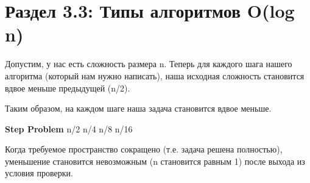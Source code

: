 \vspace{\baselineskip}
\section*{Раздел 3.3: Типы алгоритмов O(log n)}

\vspace{\baselineskip}
Допустим, у нас есть сложность размера n. Теперь для каждого шага нашего алгоритма (который нам нужно написать), наша исходная сложность становится вдвое меньше предыдущей  (n/2).

\vspace{\baselineskip}
Таким образом, на каждом шаге наша задача становится вдвое меньше.

\vspace{\baselineskip}

\textbf{Step Problem} \hspace{6,5mm} n/2  \hspace*{6,5mm} n/4  \hspace*{6,5mm} n/8  \hspace*{6,5mm} n/16 \newline


Когда  требуемое пространство сокращено (т.е. задача решена полностью), уменьшение становится невозможным (n становится равным 1) после выхода из условия проверки.


